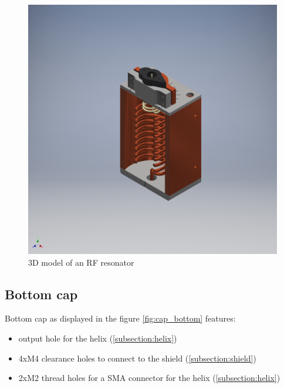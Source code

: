 \begin{figure}[h]
	\centering
	\includegraphics[width=\textwidth]{images/resonator}
	\caption{3D model of an RF resonator}
	\label{fig:resonator}
\end{figure}

\clearpage
\subsection{Bottom cap}
\label{subsection:cap_bottom}
Bottom cap as displayed in the figure \ref{fig:cap_bottom} features:
\begin{itemize}
	\item output hole for the helix (\ref{subsection:helix})
	\item 4xM4 clearance holes to connect to the shield (\ref{subsection:shield})
	\item 2xM2 thread holes for a SMA connector for the helix (\ref{subsection:helix})
\end{itemize}


